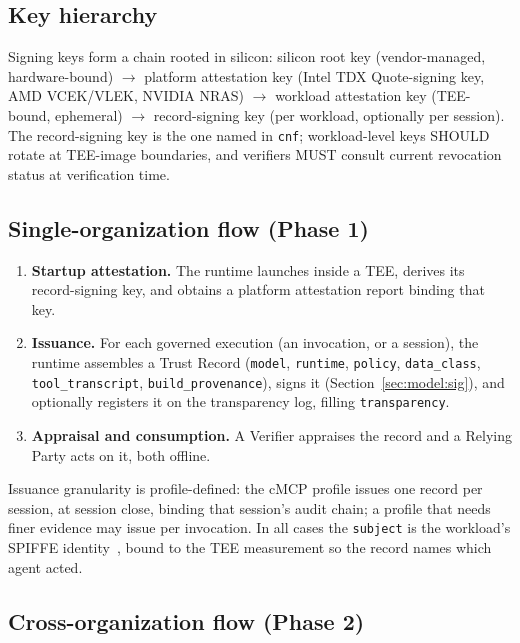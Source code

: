 \subsection{Key hierarchy}

Signing keys form a chain rooted in silicon:
silicon root key (vendor-managed, hardware-bound) $\rightarrow$ platform attestation
key (Intel TDX Quote-signing key, AMD VCEK/VLEK, NVIDIA NRAS) $\rightarrow$ workload
attestation key (TEE-bound, ephemeral) $\rightarrow$ record-signing key (per
workload, optionally per session). The record-signing key is the one named in
\texttt{cnf}; workload-level keys SHOULD rotate at TEE-image boundaries, and
verifiers MUST consult current revocation status at verification time.

\subsection{Single-organization flow (Phase 1)}

\begin{enumerate}[leftmargin=1.5em]
  \item \textbf{Startup attestation.} The runtime launches inside a TEE, derives its
    record-signing key, and obtains a platform attestation report binding that key.
  \item \textbf{Issuance.} For each governed execution (an invocation, or a session),
    the runtime assembles a Trust Record (\texttt{model}, \texttt{runtime},
    \texttt{policy}, \texttt{data\_class}, \texttt{tool\_transcript},
    \texttt{build\_provenance}), signs it (Section~\ref{sec:model:sig}), and
    optionally registers it on the transparency log, filling \texttt{transparency}.
  \item \textbf{Appraisal and consumption.} A Verifier appraises the record and a
    Relying Party acts on it, both offline.
\end{enumerate}

Issuance granularity is profile-defined: the cMCP profile issues one record per
session, at session close, binding that session's audit chain; a profile that needs
finer evidence may issue per invocation. In all cases the \texttt{subject} is the
workload's SPIFFE identity~\citep{spiffe2018}, bound to the TEE measurement so the
record names which agent acted.

\subsection{Cross-organization flow (Phase 2)}

